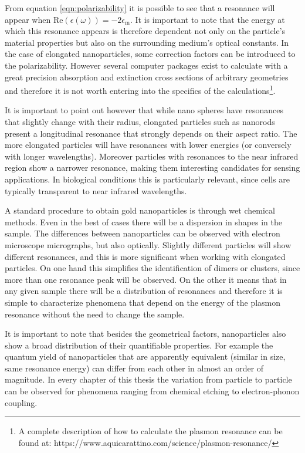 From equation \ref{eqn:polarizability} it is possible to see that a resonance
will appear when $\textrm{Re}(\epsilon(\omega)) = -2\epsilon_\textrm{m}$. It is
important to note that the energy at which this resonance appears is therefore
dependent not only on the particle's material properties but also on the
surrounding medium's optical constants. In the case of elongated nanoparticles,
some correction factors can be introduced to the polarizability. However several
computer packages\cite{Yurkin2011,oskooi2010meep,draine2013user} exist to
calculate with a great precision absorption and extinction cross sections of
arbitrary geometries and therefore it is not worth entering into the specifics
of the calculations\footnote{A complete description of how to calculate the
plasmon resonance can be found at:\newline
https://www.aquicarattino.com/science/plasmon-resonance/}.

\begin{sloppypar}
It is important to point out however that while nano spheres have resonances
that slightly change with their radius, elongated particles such as nanorods
present a longitudinal resonance that strongly depends on their aspect ratio.
The more elongated particles will have resonances with lower energies (or
conversely with longer wavelengths). Moreover particles with resonances to the
near infrared region show a narrower resonance\cite{Sonnichsen2002}, making them
interesting candidates for sensing applications. In biological conditions this
is particularly relevant, since cells are typically transparent to near infrared
wavelengths.
\end{sloppypar}
\begin{sloppypar}
A standard procedure to obtain gold nanoparticles is through wet chemical
methods\cite{Vigderman2012}. Even in the best of cases there will be a
dispersion in shapes in the sample. The differences between nanoparticles can be
observed with electron microscope micrographs, but also optically. Slightly
different particles will show different resonances\cite{Lindfors2004}, and this
is more significant when working with elongated particles. On one hand this
simplifies the identification of dimers or clusters, since more than one
resonance peak will be observed. On the other it means that in any given sample
there will be a distribution of resonances and therefore it is simple to
characterize phenomena that depend on the energy of the plasmon resonance
without the need to change the sample.
\end{sloppypar}
It is important to note that besides the geometrical factors, nanoparticles also
show a broad distribution of their quantifiable properties. For example the
quantum yield of nanoparticles that are apparently equivalent (similar in size,
same resonance energy) can differ from each other in almost an order of
magnitude\cite{Yorulmaz2012}. In every chapter of this thesis the variation from
particle to particle can be observed for phenomena ranging from chemical
etching\cite{Carattino2016} to electron-phonon coupling.

